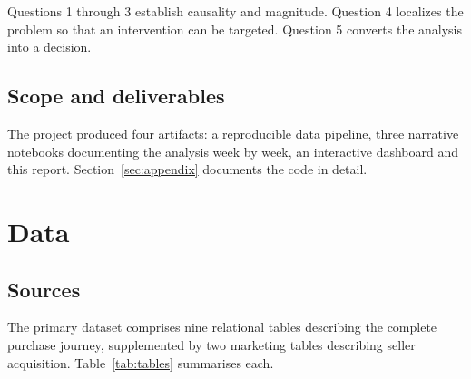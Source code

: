 \documentclass[11pt,a4paper]{article}
\begin{document}
Questions 1 through 3 establish causality and magnitude. Question 4 localizes the
problem so that an intervention can be targeted. Question 5 converts the analysis
into a decision.

\subsection{Scope and deliverables}

The project produced four artifacts: a reproducible data pipeline, three narrative
notebooks documenting the analysis week by week, an interactive dashboard and this
report. Section~\ref{sec:appendix} documents the code in detail.

\section{Data}

\subsection{Sources}

The primary dataset comprises nine relational tables describing the complete
purchase journey, supplemented by two marketing tables describing seller
acquisition. Table~\ref{tab:tables} summarises each.
\end{document}
